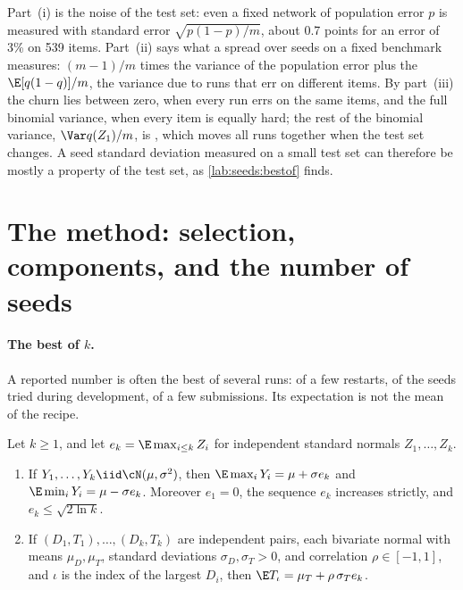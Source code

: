 \begin{refsection}
Part~(i) is the noise of the test set: even a fixed network of population error $p$ is measured with standard error $\sqrt{p(1-p)/m}$, about 0.7 points for an error of 3\% on 539 items. Part~(ii) says what a spread over seeds on a fixed benchmark measures: $(m-1)/m$ times the variance of the population error plus the  $\E[q(1-q)]/m$, the variance due to runs that err on different items. By part~(iii) the churn lies between zero, when every run errs on the same items, and the full binomial variance, when every item is equally hard; the rest of the binomial variance, $\Var q(Z_1)/m$, is , which moves all runs together when the test set changes. A seed standard deviation measured on a small test set can therefore be mostly a property of the test set, as \cref{lab:seeds:bestof} finds.


\section{The method: selection, components, and the number of seeds}\label{sec:seeds:components}

\paragraph{The best of $k$.} A reported number is often the best of several runs: of a few restarts, of the seeds tried during development, of a few submissions. Its expectation is not the mean of the recipe.

\begin{proposition}\label{prop:seeds:bestof}
Let $k\ge1$, and let $e_k=\E\max_{i\le k}Z_i$ for independent standard normals $Z_1,\dots,Z_k$.
\begin{enumerate}
\item If $Y_1,\dots,Y_k\iid\cN(\mu,\sigma^2)$, then $\E\max_iY_i=\mu+\sigma e_k$ and $\E\min_iY_i=\mu-\sigma e_k$. Moreover $e_1=0$, the sequence $e_k$ increases strictly, and $e_k\le\sqrt{2\ln k}$.
\item If $(D_1,T_1),\dots,(D_k,T_k)$ are independent pairs, each bivariate normal with means $\mu_D,\mu_T$, standard deviations $\sigma_D,\sigma_T>0$, and correlation $\rho\in[-1,1]$, and $\iota$ is the index of the largest $D_i$, then $\E T_\iota=\mu_T+\rho\,\sigma_Te_k$.
\end{enumerate}
\end{proposition}


\end{refsection}
